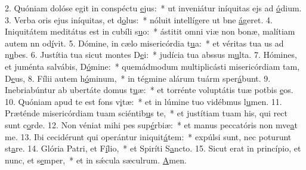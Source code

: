 2. Quóniam dolóse egit in conspéctu \uline{e}jus:~* ut inveniátur iníquitas ejs ad \uline{ó}dium.
3. Verba oris ejus iníquitas, et d\uline{o}lus:~* nóluit intellígere ut bne \uline{á}geret.
4. Iniquitátem meditátus est in cubíli s\uline{u}o:~* ástitit omni viæ non bonæ, malítiam autem nn od\uline{í}vit.
5. Dómine, in cælo misericórdia t\uline{u}a:~* et véritas tua us ad n\uline{u}bes.
6. Justítia tua sicut montes D\uline{e}i:~* judícia tua abssus m\uline{u}lta.
7. Hómines, et juménta salvábis, D\uline{ó}mine:~* quemádmodum multiplicásti misericórdiam tam, D\uline{e}us,
8. Fílii autem h\uline{ó}minum,~* in tégmine alárum tuárm sper\uline{á}bunt.
9. Inebriabúntur ab ubertáte domus t\uline{u}æ:~* et torrénte voluptátis tuæ potbis \uline{e}os.
10. Quóniam apud te est fons v\uline{i}tæ:~* et in lúmine tuo vidébmus l\uline{u}men.
11. Præténde misericórdiam tuam sciéntib\uline{u}s te,~* et justítiam tuam his, qui rect sunt c\uline{o}rde.
12. Non véniat mihi pes sup\uline{é}rbiæ:~* et manus peccatóris non mve\uline{a}t me.
13. Ibi cecidérunt qui operántur iniquit\uline{á}tem:~* expúlsi sunt, nec poturunt st\uline{a}re.
14. Glória Patri, et F\uline{í}lio,~* et Spiríti S\uline{a}ncto.
15. Sicut erat in princípio, et nunc, et s\uline{e}mper,~* et in sǽcula sæculrum. \uline{A}men.
